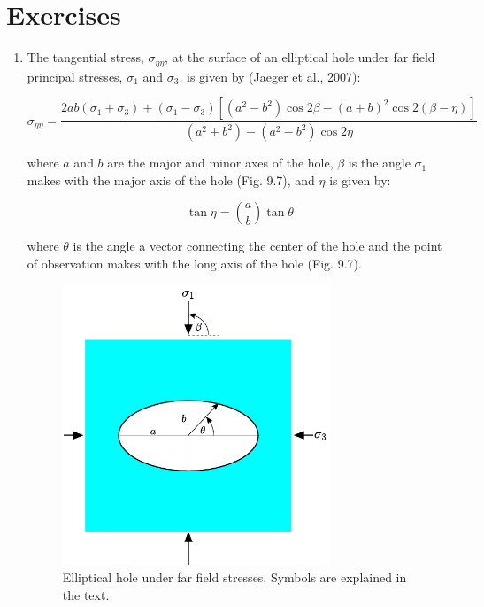 \documentclass[a4paper , 12pt]{book}
\begin{document}
\section{Exercises}

\begin{enumerate}
    \item The tangential stress, $\sigma_{\eta\eta}$, at the surface of an elliptical hole under far field principal stresses, $\sigma_1$ and $\sigma_3$, is given by (Jaeger et al., 2007):
    
    \begin{equation}
        \sigma_{\eta \eta}=\frac{2 a b\left(\sigma_{1}+\sigma_{3}\right)+\left(\sigma_{1}-\sigma_{3}\right)\left[\left(a^{2}-b^{2}\right) \cos 2 \beta-(a+b)^{2} \cos 2(\beta-\eta)\right]}{\left(a^{2}+b^{2}\right)-\left(a^{2}-b^{2}\right) \cos 2 \eta}
    \end{equation}
    
    where $a$ and $b$ are the major and minor axes of the hole, $\beta$ is the angle $\sigma_1$ makes with the major axis of the hole (Fig. 9.7), and $\eta$ is given by:
    
    \begin{equation*}
        \tan\eta=\left(\frac{a}{b}\right)\tan\theta
    \end{equation*}
    
    where $\theta$ is the angle a vector connecting the center of the hole and the point of observation makes with the long axis of the hole (Fig. 9.7).
    
    \begin{figure}[ht]
    \centering
    \includegraphics[width=8cm]{ch9f16.pdf}
    \caption{Elliptical hole under far field stresses. Symbols are explained in the text.}
    \end{figure}
    

\end{enumerate}
\end{document}
